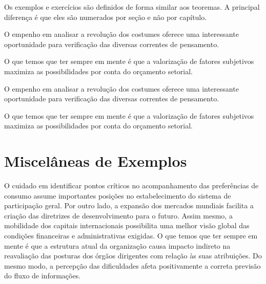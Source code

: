 \documentclass[fleqn]{profmat-cefet}
\begin{document}
Os exemplos e exercícios são definidos de forma similar aos teoremas.
A principal diferença é que eles são numerados por seção e não por capítulo.

\begin{exemplo}
    O empenho em analisar a revolução dos costumes oferece uma interessante
    oportunidade para verificação das diversas correntes de pensamento. 
\end{exemplo}

\begin{exercicio}
    O que temos que ter sempre em mente é que a valorização de fatores subjetivos
    maximiza as possibilidades por conta do orçamento setorial.
\end{exercicio}

\begin{exemplo}
    O empenho em analisar a revolução dos costumes oferece uma interessante
    oportunidade para verificação das diversas correntes de pensamento. 
\end{exemplo}

\begin{exercicio}
    O que temos que ter sempre em mente é que a valorização de fatores subjetivos
    maximiza as possibilidades por conta do orçamento setorial.
\end{exercicio}

\chapter{Miscelâneas de Exemplos}
\label{cap:misselaneas_de_exemplos}

O cuidado em identificar pontos críticos no acompanhamento das preferências de
consumo assume importantes posições no estabelecimento do sistema de
participação geral. Por outro lado, a expansão dos mercados mundiais facilita a
criação das diretrizes de desenvolvimento para o futuro. Assim mesmo, a
mobilidade dos capitais internacionais possibilita uma melhor visão global das
condições financeiras e administrativas exigidas. O que temos que ter sempre em
mente é que a estrutura atual da organização causa impacto indireto na
reavaliação das posturas dos órgãos dirigentes com relação às suas atribuições.
Do mesmo modo, a percepção das dificuldades afeta positivamente a correta
previsão do fluxo de informações. 
\end{document}
